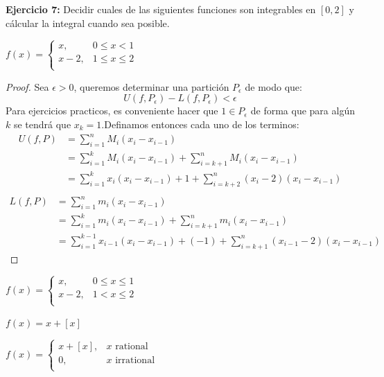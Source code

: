 \documentclass[../../main.tex]{subfiles}
\begin{document}
\question \textbf{Ejercicio 7:} Decidir cuales de las siguientes funciones son integrables en $[0, 2]$ y cálcular la integral cuando sea posible.
\begin{partes}
    \parte $f(x) = \begin{cases}
        x, & 0\le x < 1\\
        x-2, & 1\le x \le 2\\
    \end{cases}$\\
    \begin{proof}
        Sea $\epsilon > 0$, queremos determinar una partición $P_\epsilon$ de modo que:
        $$U(f, P_\epsilon) - L(f, P_\epsilon) < \epsilon$$
        Para ejercicios practicos, es conveniente hacer que $1 \in P_\epsilon$ de forma que para algún $k$ se tendrá que $x_k = 1$.Definamos entonces cada uno de los terminos:
        \begin{align*}
            U(f, P) &= \sum_{i = 1}^n M_i(x_i - x_{i-1})\\
            &= \sum_{i = 1}^{k} M_i(x_i - x_{i-1}) + \sum_{i = k+1}^n M_i(x_i - x_{i-1})\\
            &= \sum_{i = 1}^{k} x_i(x_i - x_{i-1}) + 1 + \sum_{i = k+2}^n (x_i-2)(x_i - x_{i-1})\\ 
        \end{align*}
        \begin{align*}
            L(f, P) &= \sum_{i = 1}^n m_i(x_i - x_{i-1})\\
            &= \sum_{i = 1}^{k} m_i(x_i - x_{i-1}) + \sum_{i = k+1}^{n} m_i(x_i - x_{i-1})\\
            &= \sum_{i = 1}^{k-1} x_{i-1}(x_i - x_{i-1}) + (-1) + \sum_{i = k+1}^{n} (x_{i-1}-2)(x_i - x_{i-1})
        \end{align*}
    \end{proof}

    \parte $f(x) = \begin{cases}
        x, & 0\le x \le 1\\
        x-2, & 1< x \le 2\\
    \end{cases}$

    \parte $f(x) = x + [x]$

    \parte $f(x) = \begin{cases}
        x + [x],& x \text{ rational}\\
        0,& x \text{ irrational}\\
    \end{cases}$


\end{partes}
\end{document}
